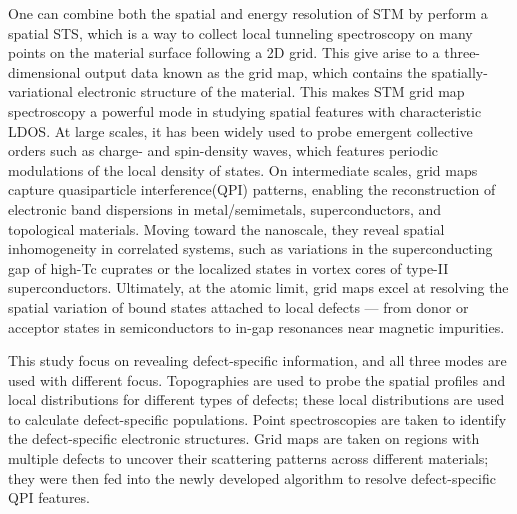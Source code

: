One can combine both the spatial and energy resolution of \ac{STM} by perform a spatial \ac{STS}, which is a way to collect local tunneling spectroscopy on many points on the material surface following a 2D grid. This give arise to a three-dimensional output data known as the grid map, which contains the spatially-variational electronic structure of the material. This makes \ac{STM} grid map spectroscopy a powerful mode in studying spatial features with characteristic \ac{LDOS}. At large scales, it has been widely used to probe emergent collective orders such as charge- and spin-density waves, which features periodic modulations of the local density of states. On intermediate scales, grid maps capture quasiparticle interference(QPI) patterns, enabling the reconstruction of electronic band dispersions in metal/semimetals, superconductors, and topological materials\cite{avrahamQuasiparticleInterferenceStudies2018}. Moving toward the nanoscale, they reveal spatial inhomogeneity in correlated systems, such as variations in the superconducting gap of high-Tc cuprates\cite{duanSingleparticleTunnelingSpectroscopy2021}\cite{boyerImagingTwoGaps2007} or the localized states in vortex cores of type-II superconductors\cite{panSTMStudiesElectronic2000}\cite{suderowImagingSuperconductingVortex2014}. Ultimately, at the atomic limit, grid maps excel at resolving the spatial variation of bound states attached to local defects — from donor or acceptor states in semiconductors\cite{mahieuDirectEvidenceShallow2005} to in-gap resonances near magnetic impurities\cite{schneiderMagnetismIngapStates2019}\cite{yangIngapQuasiparticleExcitations2013}\cite{chatzopoulosSpatiallyDispersingYuShibaRusinov2021}.

This study focus on revealing defect-specific information, and all three modes are used with different focus. Topographies are used to probe the spatial profiles and local distributions for different types of defects; these local distributions are used to calculate defect-specific populations. Point spectroscopies are taken to identify the defect-specific electronic structures. Grid maps are taken on regions with multiple defects to uncover their scattering patterns across different materials; they were then fed into the newly developed algorithm to resolve defect-specific \ac{QPI} features. 